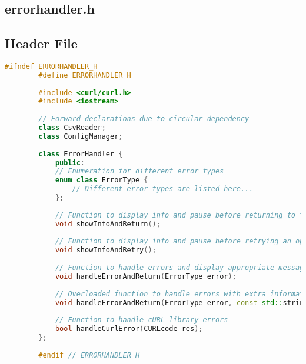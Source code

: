 \documentclass{article}
\begin{document}
	\subsection{errorhandler.h}
	
	\subsection*{Header File}
	\begin{mdframed}[backgroundcolor=background, hidealllines=false, innerleftmargin=15pt, innerrightmargin=5pt, innertopmargin=0pt, innerbottommargin=-5pt]
	\begin{lstlisting}[language=C++]
		#ifndef ERRORHANDLER_H
		#define ERRORHANDLER_H
		
		#include <curl/curl.h>
		#include <iostream>
		
		// Forward declarations due to circular dependency
		class CsvReader; 
		class ConfigManager; 
		
		class ErrorHandler {
			public:
			// Enumeration for different error types
			enum class ErrorType {
				// Different error types are listed here...
			};
			
			// Function to display info and pause before returning to the main menu
			void showInfoAndReturn();
			
			// Function to display info and pause before retrying an operation
			void showInfoAndRetry();
			
			// Function to handle errors and display appropriate messages
			void handleErrorAndReturn(ErrorType error);
			
			// Overloaded function to handle errors with extra information
			void handleErrorAndReturn(ErrorType error, const std::string& extraInfo);
			
			// Function to handle cURL library errors
			bool handleCurlError(CURLcode res);
		};
		
		#endif // ERRORHANDLER_H
	\end{lstlisting}
\end{mdframed}
	
\end{document}
